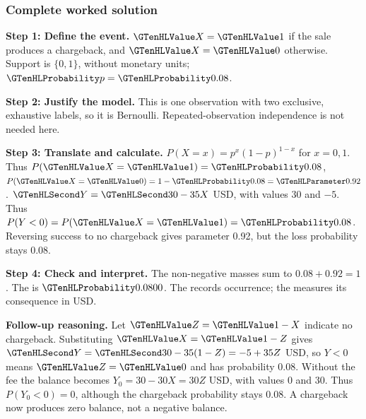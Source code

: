 \subsubsection*{Complete worked solution}\label{sol:c3-chargeback}
\par\noindent\begin{minipage}{\linewidth}
\textbf{Step 1: Define the event.} $\Indicator{X}=\Indicator{1}$ if the sale produces a chargeback, and $\Indicator{X}=\Indicator{0}$ otherwise. Support is $\{0,1\}$, without monetary units; $\SuccessProb{p}=\SuccessProb{0.08}$.
\end{minipage}\par\medskip
\par\noindent\begin{minipage}{\linewidth}
\textbf{Step 2: Justify the model.} This is one observation with two exclusive, exhaustive labels, so it is Bernoulli. Repeated-observation independence is not needed here.
\end{minipage}\par\medskip
\par\noindent\begin{minipage}{\linewidth}
\textbf{Step 3: Translate and calculate.} $P(X=x)=p^x(1-p)^{1-x}$ for $x=0,1$. Thus $P(\Indicator{X}=\Indicator{1})=\SuccessProb{0.08}$, $P(\Indicator{X}=\Indicator{0})=1-\SuccessProb{0.08}=\FailureProb{0.92}$. $\Money{Y}=\Money{30}-35X$ USD, with values 30 and $-5$. Thus $P(Y<0)=P(\Indicator{X}=\Indicator{1})=\SuccessProb{0.08}$. Reversing success to no chargeback gives parameter 0.92, but the loss probability stays 0.08.
\end{minipage}\par\medskip
\par\noindent\begin{minipage}{\linewidth}
\textbf{Step 4: Check and interpret.} The non-negative masses sum to $ 0.08+0.92=1$. The  is $\SuccessProb{0.0800}$. The  records occurrence; the  measures its consequence in USD.
\end{minipage}\par\medskip

\textbf{Follow-up reasoning.} Let $\Indicator{Z}=\Indicator{1}-X$ indicate no chargeback. Substituting $\Indicator{X}=\Indicator{1}-Z$ gives $\Money{Y}=\Money{30}-35(1-Z)=-5+35Z$ USD, so $Y<0$ means $\Indicator{Z}=\Indicator{0}$ and has probability 0.08. Without the fee the balance becomes $Y_0=30-30X=30Z$ USD, with values 0 and 30. Thus $P(Y_0<0)=0$, although the chargeback probability stays 0.08. A chargeback now produces zero balance, not a negative balance.

